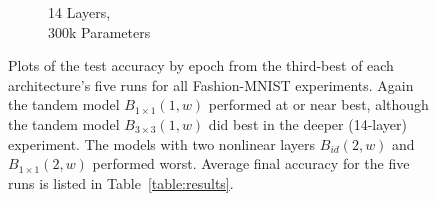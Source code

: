 \documentclass{article} %
\begin{document}
\begin{figure}[htb]
\begin{subfigure}[t]{.23\linewidth}
{}
		\captionsetup{width=.8\linewidth}
		\caption*{14 Layers,\\ 300k Parameters}%
	\end{subfigure}
	\caption{Plots of the test accuracy by epoch from the third-best of each architecture's five runs for all  Fashion-MNIST experiments. Again the tandem model $B_{1\times 1}(1,w)$ performed at or near best, although the tandem model $B_{3\times 3}(1,w)$ did best in the deeper (14-layer) experiment.  The models with two nonlinear layers $B_{id}(2,w)$ and $B_{1\times 1}(2,w)$ performed worst. Average final accuracy for the five runs is listed in Table~\ref{table:results}.}\label{fig:fashion}
\end{figure}
\end{document}
